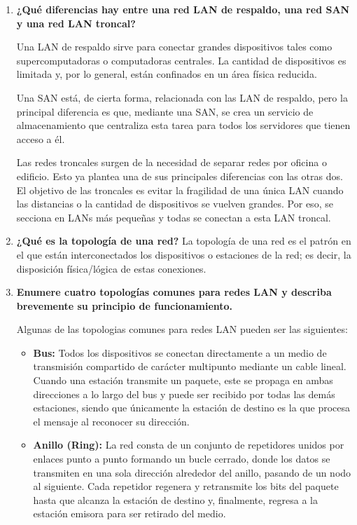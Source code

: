 \documentclass[11pt,a4paper]{article}
\begin{document}
\begin{enumerate}[label=15.\arabic*), itemsep=0.3cm]
    La diferencia clave radica en el propósito: las redes de salas de computadores buscan velocidad extrema y baja latencia entre servidores, mientras que las LANs de PCs priorizan la conectividad práctica y económica para los usuarios.
  \item
  \textbf{¿Qué diferencias hay entre una red LAN de respaldo, una red SAN y una red LAN troncal?}

  Una LAN de respaldo sirve para conectar grandes dispositivos tales como supercomputadoras o computadoras centrales. La cantidad de dispositivos es limitada y, por lo general, están confinados en un área física reducida.

  Una SAN está, de cierta forma, relacionada con las LAN de respaldo, pero la principal diferencia es que, mediante una SAN, se crea un servicio de almacenamiento que centraliza esta tarea para todos los servidores que tienen acceso a él.

  Las redes troncales surgen de la necesidad de separar redes por oficina o edificio. Esto ya plantea una de sus principales diferencias con las otras dos. El objetivo de las troncales es evitar la fragilidad de una única LAN cuando las distancias o la cantidad de dispositivos se vuelven grandes. Por eso, se secciona en LANs más pequeñas y todas se conectan a esta LAN troncal.

  \item \textbf{¿Qué es la topología de una red?}
      La topología de una red es el patrón en el que están interconectados los dispositivos o estaciones de la red; es decir, la disposición física/lógica de estas conexiones.
  \item
  \textbf{Enumere cuatro topologías comunes para redes LAN y describa brevemente su principio de funcionamiento.}

Algunas de las topologias comunes para redes LAN pueden ser las siguientes:
\begin{itemize}
    \item \textbf{Bus:} Todos los dispositivos se conectan directamente a un medio de transmisión compartido de carácter multipunto mediante un cable lineal. Cuando una estación transmite un paquete, este se propaga en ambas direcciones a lo largo del bus y puede ser recibido por todas las demás estaciones, siendo que únicamente la estación de destino es la que procesa el mensaje al reconocer su dirección.
    
    \item \textbf{Anillo (Ring):} La red consta de un conjunto de repetidores unidos por enlaces punto a punto formando un bucle cerrado, donde los datos se transmiten en una sola dirección alrededor del anillo, pasando de un nodo al siguiente. Cada repetidor regenera y retransmite los bits del paquete hasta que alcanza la estación de destino y, finalmente, regresa a la estación emisora para ser retirado del medio.
    

\end{itemize}
\end{enumerate}
\end{document}
